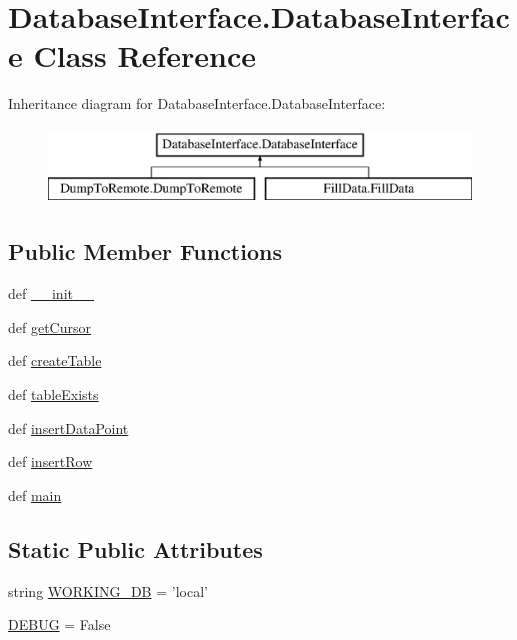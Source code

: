 \hypertarget{class_database_interface_1_1_database_interface}{\section{Database\-Interface.\-Database\-Interface Class Reference}
\label{class_database_interface_1_1_database_interface}
}
Inheritance diagram for Database\-Interface.\-Database\-Interface\-:\begin{figure}[H]
\begin{center}
\leavevmode
\includegraphics[height=2.000000cm]{class_database_interface_1_1_database_interface}
\end{center}
\end{figure}
\subsection*{Public Member Functions}
\begin{DoxyCompactItemize}
\item 
def \hyperlink{class_database_interface_1_1_database_interface_a79b2f185cf35d225238e22921254ba0f}{\-\_\-\-\_\-init\-\_\-\-\_\-}
\item 
def \hyperlink{class_database_interface_1_1_database_interface_a9c7a69525645d39f1d2967b2221b0e95}{get\-Cursor}
\item 
def \hyperlink{class_database_interface_1_1_database_interface_a403157af3a4e682ce0244a59885980e3}{create\-Table}
\item 
def \hyperlink{class_database_interface_1_1_database_interface_a0cdcada6026e9de3ef363e7ffe43a055}{table\-Exists}
\item 
def \hyperlink{class_database_interface_1_1_database_interface_a62f0ccdb9b87ae7fd37f57058177b29b}{insert\-Data\-Point}
\item 
def \hyperlink{class_database_interface_1_1_database_interface_a5ce1c3e2d2da9cfc3e51162f8ce00e63}{insert\-Row}
\item 
def \hyperlink{class_database_interface_1_1_database_interface_a34cd488b227a7742298c622a70511ae1}{main}
\end{DoxyCompactItemize}
\subsection*{Static Public Attributes}
\begin{DoxyCompactItemize}
\item 
string \hyperlink{class_database_interface_1_1_database_interface_ac0a2837d86558a1bfe62834dcd6274f3}{W\-O\-R\-K\-I\-N\-G\-\_\-\-D\-B} = 'local'
\item 
\hyperlink{class_database_interface_1_1_database_interface_ae92289621f90ec296eb0cd89b9f6fc91}{D\-E\-B\-U\-G} = False
\end{DoxyCompactItemize}


